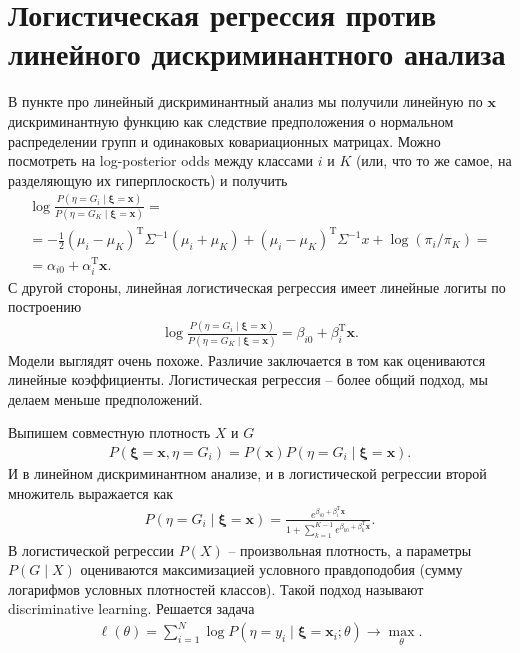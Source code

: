 \documentclass{article}
\begin{document}
\section{Логистическая регрессия против линейного дискриминантного анализа}
В пункте про линейный дискриминантный анализ мы получили линейную по $\mathbf{x}$ дискриминантную функцию как следствие предположения о нормальном распределении групп и одинаковых ковариационных матрицах. Можно посмотреть на log-posterior odds между классами $i$ и $K$ (или, что то же самое, на разделяющую их гиперплоскость) и получить
\begin{multline*}
  \log \frac{P(\eta = G_i \mid \boldsymbol{\xi} = \mathbf{x})}{P(\eta = G_K \mid \boldsymbol{\xi} = \mathbf{x})} = \\ = -\frac{1}{2} (\mu_i - \mu_K)^\mathrm{T} \Sigma^{-1}(\mu_i + \mu_K) + (\mu_i - \mu_K)^\mathrm{T} \Sigma^{-1}x + \log(\pi_i/\pi_K) = \\
  = \alpha_{i0} + \alpha_i^\mathrm{T}\mathbf{x}.
\end{multline*}
С другой стороны, линейная логистическая регрессия имеет линейные логиты по построению
\begin{align*}
  \log \frac{P(\eta = G_i \mid \boldsymbol{\xi} = \mathbf{x})}{P(\eta = G_K \mid \boldsymbol{\xi} = \mathbf{x})} = \beta_{i0} + \beta_i^\mathrm{T}\mathbf{x}.
\end{align*}
Модели выглядят очень похоже. Различие заключается в том как оцениваются линейные коэффициенты. Логистическая регрессия -- более общий подход, мы делаем меньше предположений.

Выпишем совместную плотность $X$ и $G$
\begin{align*}
  P(\boldsymbol{\xi} = \mathbf{x}, \eta = G_i) = P(\mathbf{x})P(\eta = G_i \mid \boldsymbol{\xi} = \mathbf{x}).
\end{align*}
И в линейном дискриминантном анализе, и в логистической регрессии второй множитель выражается как
\begin{align*}
  P(\eta = G_i \mid \boldsymbol{\xi} = \mathbf{x}) = \frac{e^{\beta_{i0} + \beta^\mathrm{T}_i \mathbf{x}}}{1 + \sum_{k = 1}^{K - 1}e^{\beta_{k0} + \beta^\mathrm{T}_k \mathbf{x}}}.
\end{align*}
В логистической регрессии $P(X)$ -- произвольная плотность, а параметры $P(G \mid X)$ оцениваются максимизацией условного правдоподобия (сумму логарифмов условных плотностей классов). Такой подход называют discriminative learning. Решается задача
\begin{align*}
  \ell(\theta) = \sum_{i = 1}^{N} \log P(\eta = y_i \mid \boldsymbol{\xi} = \mathbf{x}_i; \theta) \rightarrow \max_\theta.
\end{align*}
\end{document}
